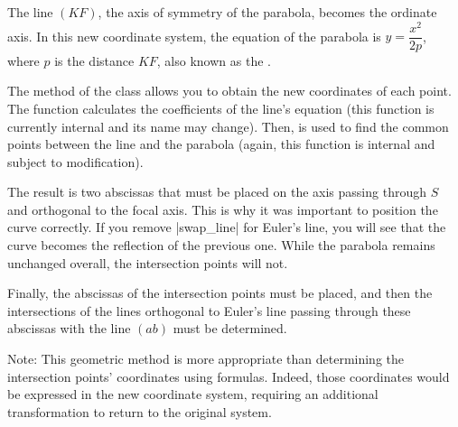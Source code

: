 The line $(KF)$, the axis of symmetry of the parabola, becomes the ordinate axis. In this new coordinate system, the equation of the parabola is $y = \dfrac{x^2}{2p}$, where $p$ is the distance $KF$, also known as the .

The  method of the  class allows you to obtain the new coordinates of each point. The  function calculates the coefficients of the line's equation (this function is currently internal and its name may change). Then,  is used to find the common points between the line and the parabola (again, this function is internal and subject to modification).

The result is two abscissas that must be placed on the axis passing through $S$ and orthogonal to the focal axis. This is why it was important to position the curve correctly. If you remove |swap_line| for Euler's line, you will see that the curve becomes the reflection of the previous one. While the parabola remains unchanged overall, the intersection points will not.

Finally, the abscissas of the intersection points must be placed, and then the intersections of the lines orthogonal to Euler's line passing through these abscissas with the line $(ab)$ must be determined.

Note: This geometric method is more appropriate than determining the intersection points' coordinates using formulas. Indeed, those coordinates would be expressed in the new coordinate system, requiring an additional transformation to return to the original system.
  


